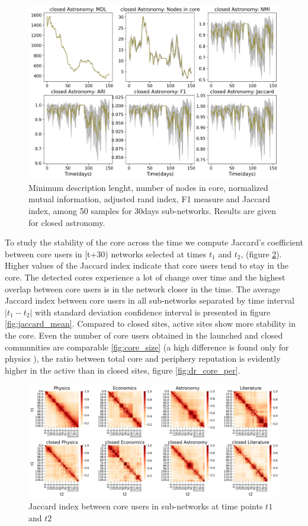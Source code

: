 \begin{figure}
	\centering
	\includegraphics[width=0.8\linewidth]{Figures/FigA8.png}
	\caption{Minimum description lenght, number of nodes in core, normalized mutual information, adjusted rand index, F1 measure and Jaccard index, among 50 samples for 30days sub-networks. Results are given for closed astronomy. }
	\label{fig:sample}
\end{figure}


To study the stability of the core across the time we compute Jaccard’s coefficient between core users in [t+30) networks selected at times $t_1$ and $t_2$, (figure \ref{fig:jaccard_hm}). Higher values of the Jaccard index indicate that core users tend to stay in the core. The detected cores experience a lot of change over time and the highest overlap between core users is in the network closer in the time. The average Jaccard index between core users in all sub-networks separated by time interval $|t_1 - t_2|$ with standard deviation confidence interval is presented in figure \ref{fig:jaccard_mean}. Compared to closed sites, active sites show more stability in the core. Even the number of core users obtained in the launched and closed communities are comparable \ref{fig:core_size} (a high difference is found only for physics ), the ratio between total core and periphery reputation is evidently higher in the active than in closed sites, figure \ref{fig:dr_core_per}.  

\begin{figure}[h!]
	\centering
	\includegraphics[width=\linewidth]{Figures/FigA10.png}
	\caption{Jaccard index between core users in  sub-networks at time points $t1$ and $t2$}
	\label{fig:jaccard_hm}
\end{figure}

